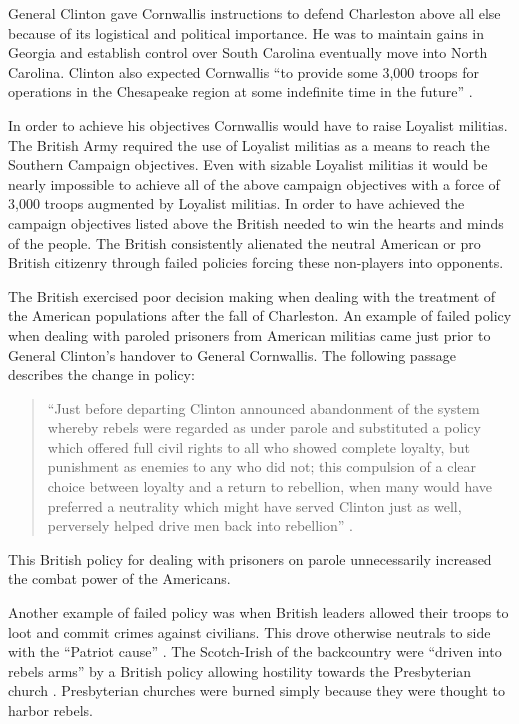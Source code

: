 General Clinton gave Cornwallis instructions to defend Charleston above all else
because of its logistical and political importance.  He was to maintain gains in
Georgia and establish control over South Carolina eventually move into North
Carolina.  Clinton also expected Cornwallis “to provide some 3,000 troops for
operations in the Chesapeake region at some indefinite time in the future”
\cite[p.51]{woodward_comparative_2002}.  

In order to achieve his objectives Cornwallis would have to raise Loyalist
militias.  The British Army required the use of Loyalist militias as a means to
reach the Southern Campaign objectives.  Even with sizable Loyalist militias it
would be nearly impossible to achieve all of the above campaign objectives with
a force of 3,000 troops augmented by Loyalist militias.   In order to have
achieved the campaign objectives listed above the British needed to win the
hearts and minds of the people.  The British consistently alienated the neutral
American or pro British citizenry through failed policies forcing these
non-players into opponents.  

The British exercised poor decision making when dealing with the treatment of
the American populations after the fall of Charleston.  An example of failed
policy when dealing with paroled prisoners from American militias came just
prior to General Clinton’s handover to General Cornwallis.  The following
passage describes the change in policy: 

\begin{quote}
“Just before departing Clinton announced abandonment of the system whereby
rebels were regarded as under parole and substituted a policy which offered full
civil rights to all who showed complete loyalty, but punishment as enemies to
any who did not; this compulsion of a clear choice between loyalty and a return
to rebellion, when many would have preferred a neutrality which might have
served Clinton just as well, perversely helped drive men back into rebellion”
\cite[p.12]{weigley_partisan_1970}.
\end{quote} 

This British policy for dealing with prisoners on parole unnecessarily increased
the combat power of the Americans.

Another example of failed policy was when British leaders allowed their troops
to loot and commit crimes against civilians.  This drove otherwise neutrals to
side with the “Patriot cause” \cite[p.13]{weigley_partisan_1970}. The Scotch-Irish of the
backcountry were “driven into rebels arms” by a British policy allowing
hostility towards the Presbyterian church \cite[p.13]{weigley_partisan_1970}.  Presbyterian
churches were burned simply because they were thought to harbor rebels.  

